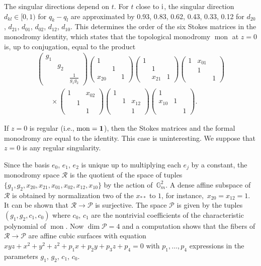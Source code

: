 \documentclass[10pt,a4paper]{amsart}
\numberwithin{equation}{section}
\begin{document}
The singular directions depend on $t$. For $t$ close to ${\rm i}$, the singular direction $d_{kl} \in [0,1)$ for $ q_k-q_l$ are approximated
by 0.93, 0.83, 0.62, 0.43, 0.33, 0.12 for $d_{20}$, $d_{21}$, $ d_{01}$, $d_{02}$, $d_{12}$, $d_{10}$.
This determines the order of the six Stokes matrices in the monodromy identity, which states that the topological monodromy $\operatorname{mon}$ at
$z=0$ is, up to conjugation, equal to the product
\begin{gather*}
\begin{pmatrix} g_1& & \\ &g_2 & \\ & &\frac{1}{g_1g_2} \end{pmatrix}
\begin{pmatrix} 1& & \\ &1 & \\ x_{20}& &1 \end{pmatrix}
\begin{pmatrix} 1 & & \\ &1 & \\ &x_{21} & 1 \end{pmatrix}
\begin{pmatrix} 1& x_{01}& \\ &1 & \\ & &1 \end{pmatrix} \\
\qquad\times\begin{pmatrix} 1 & & x_{02}\\ &1 & \\ & & 1 \end{pmatrix}
\begin{pmatrix} 1& & \\ &1 & x_{12}\\ & & 1 \end{pmatrix}
\begin{pmatrix} 1& & \\ x_{10}&1 & \\ & & 1 \end{pmatrix}. \end{gather*}


 If $z=0$ is regular (i.e., $\operatorname{mon}={\bf 1}$), then the Stokes matrices and the formal monodromy are equal to the identity. This case is uninteresting. We suppose that $z=0$ is any regular singularity.

Since the basis $e_0$, $e_1$, $e_2$ is unique up to multiplying each $e_j$ by a constant, the monodromy space
$\mathcal{R}$ is the quotient of the space of tuples
$\{g_1,g_2,x_{20}, x_{21},x_{01}, x_{02}, x_{12},x_{10}\}$ by the action of~$\mathbb{G}_m^2$. A dense affine
subspace of $\mathcal{R}$ is obtained by normalization two of the $x_{**}$ to $1$, for instance,~${x_{20}=x_{12}=1}$.
It can be shown that $\mathcal{R}\rightarrow \mathcal{P}$ is surjective. The space $\mathcal{P}$ is given by the
tuples $(g_1,g_2, c_1,c_0)$ where $c_0$, $c_1$ are the nontrivial coefficients of the characteristic polynomial of $\operatorname{mon}$.
Now $\dim \mathcal{P}=4$ and a computation shows that the fibers of $\mathcal{R}\rightarrow \mathcal{P}$ are
affine cubic surfaces with equation $xyz+x^2+y^2+z^2+p_1x+p_2y+p_3z+p_4=0$ with $p_1,\dots ,p_4$ expressions in the
parameters $g_1$, $g_2$, $c_1$, $c_0$.
\end{document}
